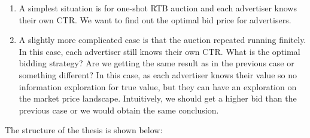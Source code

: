 \begin{enumerate}

\item A simplest situation is for one-shot RTB auction and each advertiser knows their own CTR. We want to find out the optimal bid price for advertisers.

\item A slightly more complicated case is that the auction repeated running finitely. In this case, each advertiser still knows their own CTR. What is the optimal bidding strategy? Are we getting the same result as in the previous case or something different? In this case, as each advertiser knows their value so no information exploration for true value, but they can have an exploration on the market price landscape. Intuitively, we should get a higher bid than the previous case or we would obtain the same conclusion.

\end{enumerate}
The structure of the thesis is shown below:
